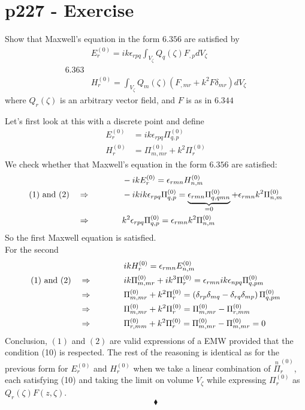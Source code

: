 \section{p227 - Exercise}
\begin{tcolorbox}
Show that Maxwell's equation in the form $\mathbf{6.356}$ are satisfied by 
 $$\begin{array}{ll}& E^{(0)}_r= ik\epsilon_{rpq}\int_{V_{\zeta}}Q_q\left(\zeta\right)F_{,p}dV_{\zeta}\\
 \mathbf{6.363}&\\
 &H^{(0)}_r= \int_{V_{\zeta}}Q_m\left(\zeta\right)\left(F_{,mr}+k^2F\delta_{mr}\right) dV_{\zeta}
 \end{array}$$
 where $Q_r\left(\zeta\right)$ is an arbitrary vector field, and $F$ is as in $\mathbf{6.344}$
\end{tcolorbox}
Let's first look at this with a discrete point and define 
\begin{align}
 E^{(0)}_r&= ik\epsilon_{rpq}\Pi^{(0)}_{q,p}\\
 H^{(0)}_r&= \Pi^{(0)}_{m,mr}+k^2\Pi^{(0)}_r
\end{align}
We check whether that Maxwell's equation in the form $\mathbf{6.356}$ are satisfied:
\begin{align}
&-ikE^{(0)}_r= \epsilon_{rmn}H^{(0)}_{n,m}\\
\text{(1) and (2)}\quad\Rightarrow \quad\quad\quad\quad &-ikik\epsilon_{rpq}\Pi^{(0)}_{q,p}= \underbrace{\epsilon_{rmn}\Pi^{(0)}_{q,qmn}}_{=0}+\epsilon_{rmn}k^2\Pi^{(0)}_{n,m}\\
\Rightarrow\quad\quad\quad\quad &k^2\epsilon_{rpq}\Pi^{(0)}_{q,p}= \epsilon_{rmn}k^2\Pi^{(0)}_{n,m}
\end{align}
So the first Maxwell equation is satisfied.\\
For the second
\begin{align}
&ikH^{(0)}_r= \epsilon_{rmn}E^{(0)}_{n,m}\\
\text{(1) and (2)}\quad\Rightarrow \quad\quad\quad\quad &ik\Pi^{(0)}_{m,mr}+ik^3\Pi^{(0)}_r= \epsilon_{rmn}ik\epsilon_{npq}\Pi^{(0)}_{q,pm}\\
\Rightarrow\quad\quad\quad\quad &\Pi^{(0)}_{m,mr}+k^2\Pi^{(0)}_r= \left(\delta_{rp}\delta_{mq}-\delta_{rq}\delta_{mp}\right)\Pi^{(0)}_{q,pm}\\
\Rightarrow\quad\quad\quad\quad &\Pi^{(0)}_{m,mr}+k^2\Pi^{(0)}_r= \Pi^{(0)}_{m,mr}-\Pi^{(0)}_{r,mm}\\
\Rightarrow\quad\quad\quad\quad &\Pi^{(0)}_{r,mm}+k^2\Pi^{(0)}_r= \Pi^{(0)}_{m,mr}-\Pi^{(0)}_{m,mr}=0
\end{align}
Conclusion, $(1)$ and $(2)$ are valid expressions of a EMW provided that the condition (10) is respected.
The rest of the reasoning is identical as for  the previous form for $E^{(0)}_r$ and $H^{(0)}_r$ when we take a linear combination of $\overset{n}{\Pi}^{(0)}_r$, each satisfying (10) and taking the limit on volume $V_{\zeta}$ while expressing $\Pi^{(0)}_{r}$ as $Q_{r}\left(\zeta \right)F\left(z,\zeta\right)$.
 $$\blacklozenge$$
\newpage


